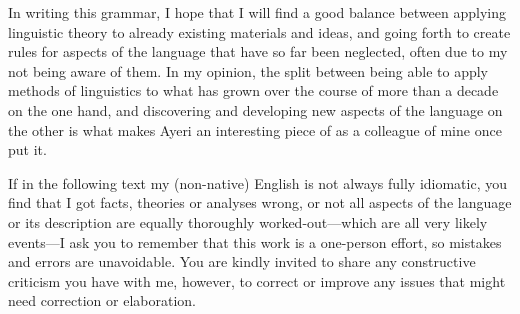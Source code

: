 In writing this grammar, I hope that I will find a good balance between 
applying linguistic theory to already existing materials and ideas, and going 
forth to create rules for aspects of the language that have so far been 
neglected, often due to my not being aware of them. In my opinion, the split 
between being able to apply methods of linguistics to what has grown over the 
course of more than a decade on the one hand, and discovering and developing 
new aspects of the language on the other is what makes Ayeri an interesting 
piece of  as a colleague of mine once put it.

If in the following text my (non-native) English is not always fully idiomatic, 
you find that I got facts, theories or analyses wrong, or not all aspects of 
the language or its description are equally thoroughly worked-out---which are 
all very likely events---I ask you to remember that this work is a one-person 
effort, so mistakes and errors are unavoidable. You are kindly invited to share 
any constructive criticism you have with me, however, to correct or improve any 
issues that might need correction or elaboration.
